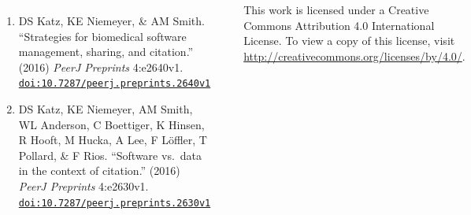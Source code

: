 \documentclass[20pt, a0paper, landscape, margin=0mm, innermargin=15mm, blockverticalspace=15mm, colspace=15mm, subcolspace=8mm]{tikzposter}
\newcommand*{\doi}[1]{\href{https://doi.org/#1}{\nolinkurl{doi:#1}}}
\begin{document}
\begin{columns}
{\begin{enumerate}[leftmargin=1cm,topsep=0pt]
        \item DS Katz, KE Niemeyer, \& AM Smith.
        ``Strategies for biomedical software management, sharing, and citation.'' (2016) \textit{PeerJ Preprints} 4:e2640v1.
        \doi{10.7287/peerj.preprints.2640v1}

        \item DS Katz, KE Niemeyer, AM Smith, WL Anderson, C Boettiger, K Hinsen, R Hooft, M Hucka, A Lee, F L\"{o}ffler, T Pollard, \& F Rios.
        ``Software vs.\ data in the context of citation.'' (2016) \textit{PeerJ Preprints} 4:e2630v1.
        \doi{10.7287/peerj.preprints.2630v1}

        \end{enumerate}

        \begin{minipage}{0.42\linewidth}
            \begin{tikzfigure}
                \includegraphics[width=\linewidth]{cc-by}
            \end{tikzfigure}
        \end{minipage}
        \hfill
        \begin{minipage}{0.55\linewidth}
        This work is licensed under a Creative Commons Attribution 4.0 International License. To view a copy of this license, visit \url{http://creativecommons.org/licenses/by/4.0/}.
        \end{minipage}
    }
\end{columns}
\end{document}
